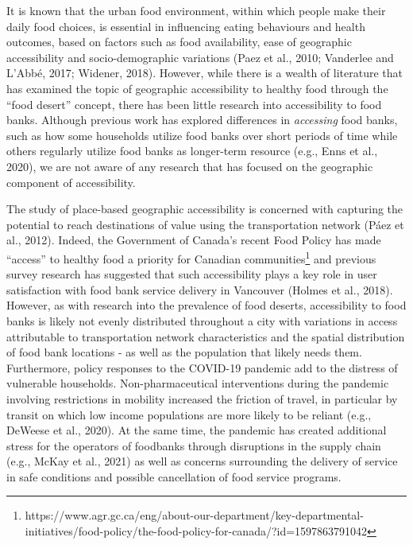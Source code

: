 \documentclass[]{elsarticle} %
\begin{document}
It is known that the urban food environment, within which people make
their daily food choices, is essential in influencing eating behaviours
and health outcomes, based on factors such as food availability, ease of
geographic accessibility and socio-demographic variations (Paez et al.,
2010; Vanderlee and L'Abbé, 2017; Widener, 2018). However, while there
is a wealth of literature that has examined the topic of geographic
accessibility to healthy food through the ``food desert'' concept, there
has been little research into accessibility to food banks. Although
previous work has explored differences in \emph{accessing} food banks,
such as how some households utilize food banks over short periods of
time while others regularly utilize food banks as longer-term resource
(e.g., Enns et al., 2020), we are not aware of any research that has
focused on the geographic component of accessibility.

The study of place-based geographic accessibility is concerned with
capturing the potential to reach destinations of value using the
transportation network (Páez et al., 2012). Indeed, the Government of
Canada's recent Food Policy has made ``access'' to healthy food a
priority for Canadian communities\footnote{https://www.agr.gc.ca/eng/about-our-department/key-departmental-initiatives/food-policy/the-food-policy-for-canada/?id=1597863791042}
and previous survey research has suggested that such accessibility plays
a key role in user satisfaction with food bank service delivery in
Vancouver (Holmes et al., 2018). However, as with research into the
prevalence of food deserts, accessibility to food banks is likely not
evenly distributed throughout a city with variations in access
attributable to transportation network characteristics and the spatial
distribution of food bank locations - as well as the population that
likely needs them. Furthermore, policy responses to the COVID-19
pandemic add to the distress of vulnerable households.
Non-pharmaceutical interventions during the pandemic involving
restrictions in mobility increased the friction of travel, in particular
by transit on which low income populations are more likely to be reliant
(e.g., DeWeese et al., 2020). At the same time, the pandemic has created
additional stress for the operators of foodbanks through disruptions in
the supply chain (e.g., McKay et al., 2021) as well as concerns
surrounding the delivery of service in safe conditions and possible
cancellation of food service programs.
\end{document}
